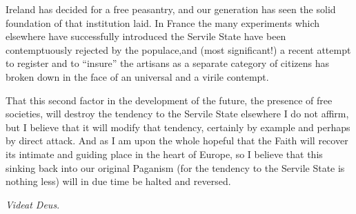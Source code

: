 \documentclass{book}
\begin{document}
Ireland has decided for a free peasantry, and our generation has seen the solid foundation of that institution laid. In France the many experiments which elsewhere have successfully introduced the Servile State have been contemptuously rejected by the populace,and (most significant!) a recent attempt to register and to “insure” the artisans as a separate category of citizens has broken down in the face of an universal and a virile contempt.

That this second factor in the development of the future, the presence of free societies, will destroy the tendency to the Servile State elsewhere I do not affirm, but I believe that it will modify that tendency, certainly by example and perhaps by direct attack. And as I am upon the whole hopeful that the Faith will recover its intimate and guiding place in the heart of Europe, so I believe that this sinking back into our original Paganism (for the tendency to the Servile State is nothing less) will in due time be halted and reversed.

\emph{Videat Deus}.
\end{document}
